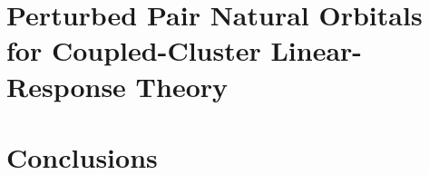 \documentclass[12pt]{report}
\begin{document}
\chapter{Perturbed Pair Natural Orbitals for Coupled-Cluster Linear-Response Theory}

\chapter{Conclusions}
%
%

%



%


%


\end{document}
